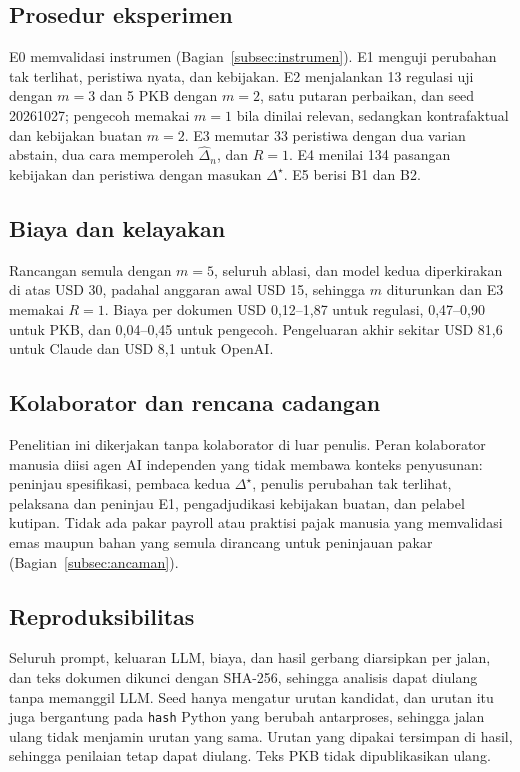 \documentclass[conference]{IEEEtran}
\makeatletter
\DeclareRobustCommand{\en}[1]{{\usefont{\f@encoding}{\f@family}{\f@series}{it}#1\/}}
\newcommand{\emas}{\star}
\makeatother
\begin{document}
\subsection{Prosedur eksperimen}
E0 memvalidasi instrumen (Bagian~\ref{subsec:instrumen}). E1 menguji perubahan tak terlihat, peristiwa nyata, dan kebijakan. E2 menjalankan 13 regulasi uji dengan $m = 3$ dan 5 PKB dengan $m = 2$, satu putaran perbaikan, dan \en{seed} 20261027; pengecoh memakai $m = 1$ bila dinilai relevan, sedangkan kontrafaktual dan kebijakan buatan $m = 2$. E3 memutar 33 peristiwa dengan dua varian \en{abstain}, dua cara memperoleh $\hat{\Delta}_n$, dan $R = 1$. E4 menilai 134 pasangan kebijakan dan peristiwa dengan masukan $\Delta^{\emas}$. E5 berisi B1 dan B2.

\subsection{Biaya dan kelayakan}
Rancangan semula dengan $m = 5$, seluruh ablasi, dan model kedua diperkirakan di atas USD 30, padahal anggaran awal USD 15, sehingga $m$ diturunkan dan E3 memakai $R = 1$. Biaya per dokumen USD 0,12--1,87 untuk regulasi, 0,47--0,90 untuk PKB, dan 0,04--0,45 untuk pengecoh. Pengeluaran akhir sekitar USD 81,6 untuk Claude dan USD 8,1 untuk OpenAI.

\subsection{Kolaborator dan rencana cadangan}
\label{subsec:kolaborator}
Penelitian ini dikerjakan tanpa kolaborator di luar penulis. Peran kolaborator manusia diisi agen AI independen yang tidak membawa konteks penyusunan: peninjau spesifikasi, pembaca kedua $\Delta^{\emas}$, penulis perubahan tak terlihat, pelaksana dan peninjau E1, pengadjudikasi kebijakan buatan, dan pelabel kutipan. Tidak ada pakar \en{payroll} atau praktisi pajak manusia yang memvalidasi emas maupun bahan yang semula dirancang untuk peninjauan pakar (Bagian~\ref{subsec:ancaman}).

\subsection{Reproduksibilitas}
Seluruh \en{prompt}, keluaran LLM, biaya, dan hasil gerbang diarsipkan per jalan, dan teks dokumen dikunci dengan SHA-256, sehingga analisis dapat diulang tanpa memanggil LLM. \en{Seed} hanya mengatur urutan kandidat, dan urutan itu juga bergantung pada \texttt{hash} Python yang berubah antarproses, sehingga jalan ulang tidak menjamin urutan yang sama. Urutan yang dipakai tersimpan di hasil, sehingga penilaian tetap dapat diulang. Teks PKB tidak dipublikasikan ulang.
\end{document}
